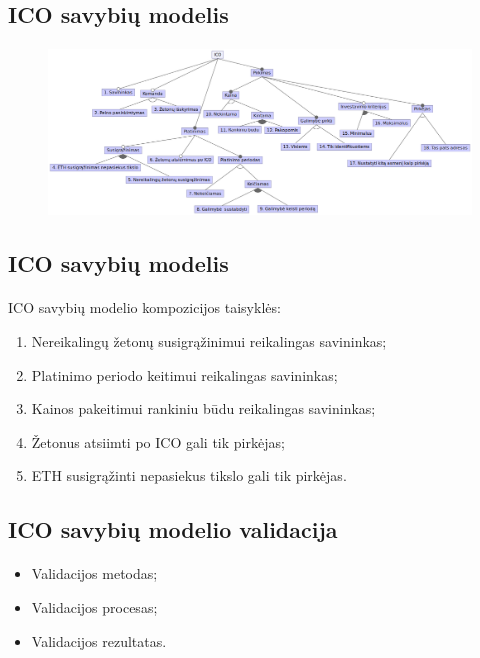 \documentclass{beamer}
\begin{document}
\subsection{ICO savybių modelis}
\begin{frame}{\insertsection}
	\framesubtitle{\insertsubsection}
    \vspace{-35.5pt}
	\begin{figure}[H]
		\centering
		\includegraphics[scale=0.3]{../img/ico_model_num}


	\end{figure}
\end{frame}

\subsection{ICO savybių modelis}
\begin{frame}{\insertsection}
\framesubtitle{\insertsubsection}
\vspace{-35.5pt}
 ICO savybių modelio kompozicijos taisyklės:
    \begin{enumerate}
        \item Nereikalingų žetonų susigrąžinimui reikalingas savininkas;
        \item Platinimo periodo keitimui reikalingas savininkas;
        \item Kainos pakeitimui rankiniu būdu reikalingas savininkas;
        \item Žetonus atsiimti po ICO gali tik pirkėjas;
        \item ETH susigrąžinti nepasiekus tikslo gali tik pirkėjas.
    \end{enumerate}
\end{frame}


\subsection{ICO savybių modelio validacija}
\begin{frame}{\insertsection}
\framesubtitle{\insertsubsection}
\vspace{-35.5pt}
\begin{itemize}
    \item Validacijos metodas;
    \item Validacijos procesas;
    \item Validacijos rezultatas.
\end{itemize}

\end{frame}
\end{document}
